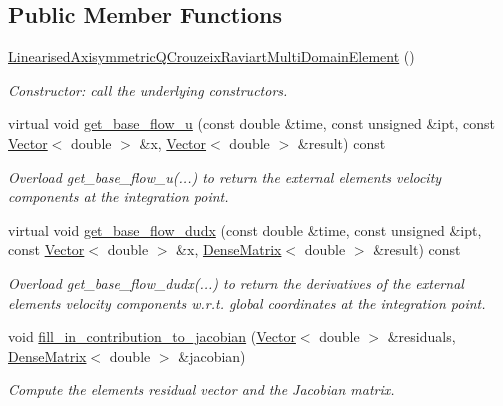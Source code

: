 \subsection*{Public Member Functions}
\begin{DoxyCompactItemize}
\item 
\hyperlink{classLinearisedAxisymmetricQCrouzeixRaviartMultiDomainElement_a44b98530424fd186461729f48aa0a9d5}{Linearised\+Axisymmetric\+Q\+Crouzeix\+Raviart\+Multi\+Domain\+Element} ()
\begin{DoxyCompactList}\small\item\em Constructor\+: call the underlying constructors. \end{DoxyCompactList}\item 
virtual void \hyperlink{classLinearisedAxisymmetricQCrouzeixRaviartMultiDomainElement_ad2f1cde1f47f056f58469c94c8ccea6d}{get\+\_\+base\+\_\+flow\+\_\+u} (const double \&time, const unsigned \&ipt, const \hyperlink{classoomph_1_1Vector}{Vector}$<$ double $>$ \&x, \hyperlink{classoomph_1_1Vector}{Vector}$<$ double $>$ \&result) const
\begin{DoxyCompactList}\small\item\em Overload get\+\_\+base\+\_\+flow\+\_\+u(...) to return the external element\textquotesingle{}s velocity components at the integration point. \end{DoxyCompactList}\item 
virtual void \hyperlink{classLinearisedAxisymmetricQCrouzeixRaviartMultiDomainElement_a69af588f46bb76f29ace74218504fe8d}{get\+\_\+base\+\_\+flow\+\_\+dudx} (const double \&time, const unsigned \&ipt, const \hyperlink{classoomph_1_1Vector}{Vector}$<$ double $>$ \&x, \hyperlink{classoomph_1_1DenseMatrix}{Dense\+Matrix}$<$ double $>$ \&result) const
\begin{DoxyCompactList}\small\item\em Overload get\+\_\+base\+\_\+flow\+\_\+dudx(...) to return the derivatives of the external element\textquotesingle{}s velocity components w.\+r.\+t. global coordinates at the integration point. \end{DoxyCompactList}\item 
void \hyperlink{classLinearisedAxisymmetricQCrouzeixRaviartMultiDomainElement_a3920198ff369a194c7d0ca4628af1a8c}{fill\+\_\+in\+\_\+contribution\+\_\+to\+\_\+jacobian} (\hyperlink{classoomph_1_1Vector}{Vector}$<$ double $>$ \&residuals, \hyperlink{classoomph_1_1DenseMatrix}{Dense\+Matrix}$<$ double $>$ \&jacobian)
\begin{DoxyCompactList}\small\item\em Compute the element\textquotesingle{}s residual vector and the Jacobian matrix. \end{DoxyCompactList}\end{DoxyCompactItemize}
